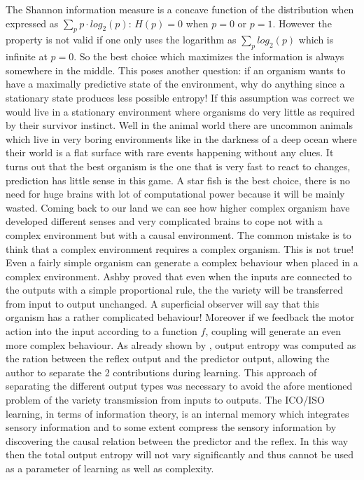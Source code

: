 The Shannon information measure is a concave function of the distribution when
expressed as $\sum_p p\cdot log_2(p)$: $H(p)=0$ when $p=0$ or $p=1$.
 However the property is not valid if one only uses the logarithm as $\sum_p log_2(p)$ which is infinite at $p=0$.
 So the best choice which maximizes the information is 
 always somewhere in the middle.
 This poses another question: if an organism wants to have
 a maximally predictive state of the environment, why do anything since a
 stationary state produces less possible entropy! If this assumption was correct
we would live in a stationary environment where organisms do very little as required
 by their survivor instinct. Well in the animal
world there are uncommon animals which live in very boring environments like
in the darkness of a deep ocean where their world is a flat surface with rare events
 happening without any clues. It turns out that the best organism is the one that is
very fast to react to changes, prediction has little sense in this game.
A star fish is the best choice, there is no need for huge brains with lot
of computational power because it will be mainly wasted. Coming back
 to our land we can see how higher complex organism have developed different
senses and very complicated brains to cope not with a complex environment but
with a causal environment. The common mistake is to think that a complex environment
 requires a complex organism. This is not true! Even a fairly simple organism
can generate a complex behaviour when placed in a complex environment.
Ashby proved that even when the inputs are connected to the outputs
with a simple proportional rule, the the variety will be transferred
from input to output unchanged. A superficial observer will say that this organism has 
a rather complicated behaviour! Moreover
 if we feedback the motor action into the input according to a function $f$,
coupling will generate an even more complex behaviour. As already shown
by \citet{Kulvicius2009:analysisdifferential}, output entropy
was computed as the ration between the reflex output and the 
predictor output, allowing the author to separate the 2 contributions during learning.
This approach of separating the different output types was necessary to
avoid the afore mentioned problem of the variety transmission from inputs to outputs.
The ICO/ISO learning, in terms of information theory, is an internal
memory which integrates sensory information and to some extent compress the
sensory information by discovering the causal relation between the predictor and the reflex.
In this way then the total output entropy will not vary significantly and thus
cannot be used as a parameter of learning as well as complexity.

